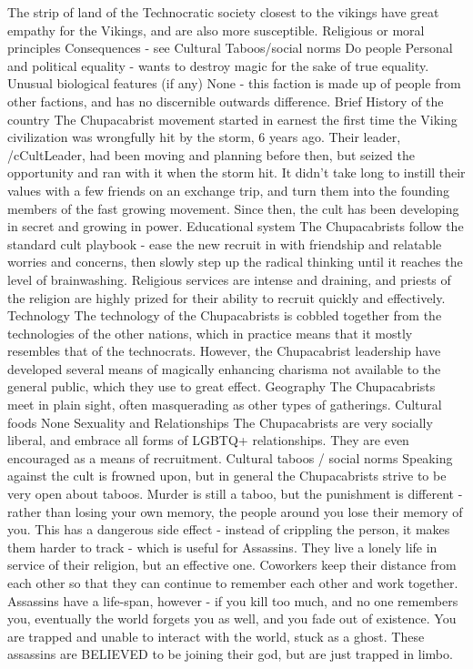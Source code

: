 \documentclass[blue]{GL2020}
\begin{document}
The strip of land of the Technocratic society closest to the vikings have great empathy for the Vikings, and are also more susceptible. 
Religious or moral principles
Consequences - see Cultural Taboos/social norms
Do people
Personal and political equality - wants to destroy magic for the sake of true equality.
Unusual biological features (if any)
None - this faction is made up of people from other factions, and has no discernible outwards difference.
Brief History of the country
The Chupacabrist movement started in earnest the first time the Viking civilization was wrongfully hit by the storm, 6 years ago. Their leader, /cCultLeader, had been moving and planning before then, but seized the opportunity and ran with it when the storm hit. It didn’t take long to instill their values with a few friends on an exchange trip, and turn them into the founding members of the fast growing movement. Since then, the cult has been developing in secret and growing in power.
Educational system
The Chupacabrists follow the standard cult playbook - ease the new recruit in with friendship and relatable worries and concerns, then slowly step up the radical thinking until it reaches the level of brainwashing. Religious services are intense and draining, and priests of the religion are highly prized for their ability to recruit quickly and effectively.
Technology
The technology of the Chupacabrists is cobbled together from the technologies of the other nations, which in practice means that it mostly resembles that of the technocrats. However, the Chupacabrist leadership have developed several means of magically enhancing charisma not available to the general public, which they use to great effect.
Geography
The Chupacabrists meet in plain sight, often masquerading as other types of gatherings.
Cultural foods
None
Sexuality and Relationships
The Chupacabrists are very socially liberal, and embrace all forms of LGBTQ+ relationships. They are even encouraged as a means of recruitment.
Cultural taboos / social norms
Speaking against the cult is frowned upon, but in general the Chupacabrists strive to be very open about taboos. Murder is still a taboo, but the punishment is different - rather than losing your own memory, the people around you lose their memory of you. 
This has a dangerous side effect - instead of crippling the person, it makes them harder to track - which is useful for Assassins. They live a lonely life in service of their religion, but an effective one. Coworkers keep their distance from each other so that they can continue to remember each other and work together. Assassins have a life-span, however - if you kill too much, and no one remembers you, eventually the world forgets you as well, and you fade out of existence. You are trapped and unable to interact with the world, stuck as a ghost. These assassins are BELIEVED to be joining their god, but are just trapped in limbo.
\end{document}
